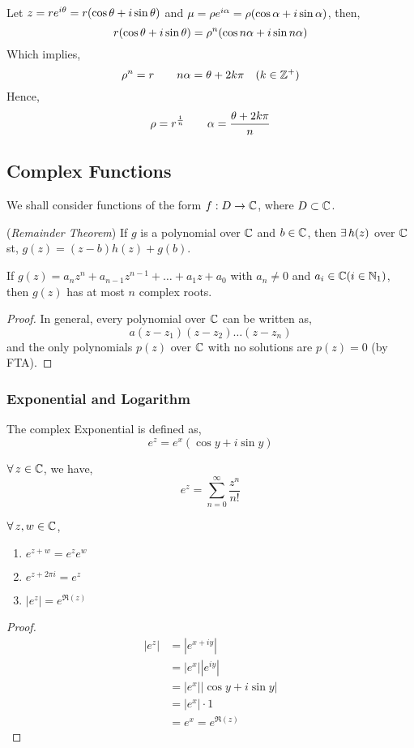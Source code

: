 \documentclass{article}
\begin{document}
Let $z = re^{i\theta} = r(\cos \theta + i\sin \theta)$ and $\mu = \rho e^{i\alpha}= \rho(\cos \alpha + i\sin \alpha)$, then,
$$ r(\cos \theta + i\sin \theta) = \rho^n(\cos n\alpha + i\sin n\alpha) $$
Which implies,
$$ \rho^n = r \qquad n\alpha = \theta + 2k\pi \quad (k \in \mathbb{Z}^+)$$
Hence,
$$ \rho = r^{\frac{1}{n}} \qquad \alpha = \frac{\theta + 2k\pi}{n} $$

\newpage
\subsection{Complex Functions}
  We shall consider functions of the form $f : D \to \mathbb{C}$, where $D \subset \mathbb{C}$.

  \begin{nlemma}{(\textit{Remainder Theorem})}
    If $g$ is a polynomial over $\mathbb{C}$ and $b\in\mathbb{C}$, then $\exists\, h(z)$ over $\mathbb{C}$ st, $g(z) = (z - b)h(z) + g(b)$.
  \end{nlemma}
  \begin{nthm}
    If $g(z) = a_nz^{n} + a_{n-1}z^{n-1} + \dots + a_1z + a_0$ with $a_n \neq 0$ and $a_i \in \mathbb{C} (i \in \mathbb{N}_1)$, then $g(z)$ has at most $n$ complex roots.
  \end{nthm}
  \begin{proof}
    In general, every polynomial over $\mathbb{C}$ can be written as,
    $$ a(z - z_1)(z - z_2)\dots(z - z_n) $$
    and the only polynomials $p(z)$ over $\mathbb{C}$ with no solutions are $p(z) = 0$ (by FTA).
  \end{proof}
\subsubsection{Exponential and Logarithm}

\begin{ndefi}
  The complex Exponential is defined as,
  $$ e^{z} = e^x (\cos y + i\sin y) $$
\end{ndefi}

\begin{nlemma}
  $\forall\, z \in \mathbb{C}$, we have,
  $$ e^z = \sum_{n=0}^{\infty} {\frac{z^n}{n!}} $$
\end{nlemma}

\begin{nlemma}
  $\forall\, z, w \in \mathbb{C}$,
  \begin{enumerate}
    \item $e^{z + w} = e^ze^w$
    \item $e^{z + 2\pi i} = e^z$
    \item $|e^z| = e^{\Re(z)}$
\end{enumerate}
\begin{proof}
  \begin{align*}
    |e^{z}| &= |e^{x + iy}|\\
    &= |e^x||e^{iy}|\\
    &= |e^x||\cos y + i\sin y|\\
    &= |e^x|\cdot 1\\
    &= e^x = e^{\Re(z)}
  \end{align*}
\end{proof}
\end{nlemma}
\end{document}
